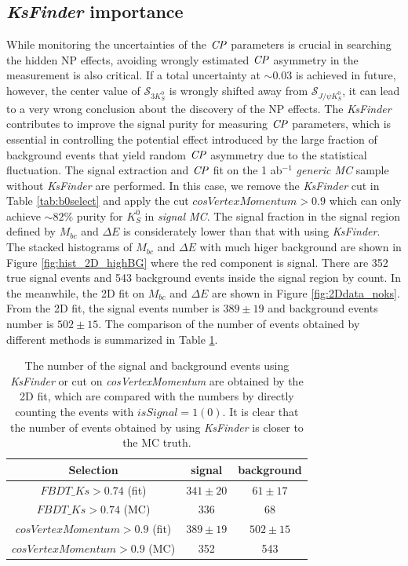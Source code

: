 \subsection{\textit{KsFinder} importance}
While monitoring the uncertainties of the $\it{CP}$ parameters is crucial in searching the hidden NP effects, avoiding wrongly estimated $\it{CP}$ asymmetry in the measurement is also critical. If a total uncertainty at $\sim 0.03$ is achieved in future, however, the center value of $\mathcal{S}_{3K_S^0}$ is wrongly shifted away from $\mathcal{S}_{J/\psi K_S^0}$, it can lead to a very wrong conclusion about the discovery of the NP effects.
The \textit{KsFinder} contributes to improve the signal purity for measuring $\it{CP}$ parameters, which is essential in controlling the potential effect introduced by the large fraction of background events that yield random $\it{CP}$ asymmetry due to the statistical fluctuation.
The signal extraction and $\it{CP}$ fit on the 1 ab$^{-1}$ \textit{generic MC} sample without \textit{KsFinder} are performed. In this case, we remove the \textit{KsFinder} cut in Table \ref{tab:b0select} and apply the cut $cosVertexMomentum > 0.9$ which can only achieve $\sim 82\%$ purity for $K_S^0$ in \textit{signal MC}. The signal fraction in the signal region defined by $M_{bc}$ and $\Delta E$ is considerately lower than that with using \textit{KsFinder}. The stacked histograms of $M_{bc}$ and $\Delta E$ with much higer background are shown in Figure \ref{fig:hist_2D_highBG} where the red component is signal. There are 352 true signal events and 543 background events inside the signal region by count. In the meanwhile, the 2D fit on $M_{bc}$ and $\Delta E$ are shown in Figure \ref{fig:2Ddata_noks}. From the 2D fit, the signal events number is $389\pm19$ and background events number is $502\pm15$. The comparison of the number of events obtained by different methods is summarized in Table \ref{tab:ksbias}.
\begin{table}[htpb]
	\centering
	\caption{The number of the signal and background events using \textit{KsFinder} or cut on \textit{cosVertexMomentum} are obtained by the 2D fit, which are compared with the numbers by directly counting the events with $isSignal=1 (0)$.
	It is clear that the number of events obtained by using \textit{KsFinder} is closer to the MC truth.}
	\label{tab:ksbias}
	\begin{tabular}{c| c |c}
		\hline
		Selection & signal  & background \\
		\hline
		${FBDT\_Ks>0.74}$ (fit) & $341\pm20$ & $61\pm17$ \\
		${FBDT\_Ks>0.74}$ (MC) & 336 & 68\\
		${cosVertexMomentum>0.9}$ (fit) & $389\pm19$ & $502\pm15$\\
		${cosVertexMomentum>0.9}$ (MC) & 352 & 543\\
		\hline
	\end{tabular}
\end{table}

